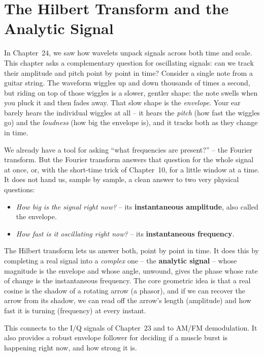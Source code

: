\chapter{The Hilbert Transform and the Analytic Signal}

In Chapter~24, we saw how wavelets unpack signals across both time and scale. This chapter asks a complementary question for oscillating signals: can we track their
amplitude and pitch point by point in time? Consider a single note from a guitar string.
The waveform wiggles up and down thousands of times a second, but riding on top of those
wiggles is a slower, gentler shape: the note swells when you pluck it and then fades
away. That slow shape is the \emph{envelope}. Your ear barely hears the individual
wiggles at all -- it hears the \emph{pitch} (how fast the wiggles go) and the
\emph{loudness} (how big the envelope is), and it tracks both as they change in time.

We already have a tool for asking ``what frequencies are present?'' -- the Fourier
transform. But the Fourier transform answers that question for the whole signal at once,
or, with the short-time trick of Chapter~10, for a little window at a time. It does not
hand us, sample by sample, a clean answer to two very physical questions:

\begin{itemize}
  \item \emph{How big is the signal right now?} -- its \textbf{instantaneous amplitude},
        also called the envelope.
  \item \emph{How fast is it oscillating right now?} -- its \textbf{instantaneous
        frequency}.
\end{itemize}

The Hilbert transform lets us answer both, point by point in time.
It does this by completing a real signal into a \emph{complex} one -- the
\textbf{analytic signal} -- whose magnitude is the envelope and whose angle, unwound,
gives the phase whose rate of change is the instantaneous frequency. The core geometric idea is that a real cosine is the shadow of a rotating arrow (a
phasor), and if we can recover the arrow from its shadow, we can read off the arrow's
length (amplitude) and how fast it is turning (frequency) at every instant.

This connects to the I/Q signals of Chapter~23 and to AM/FM demodulation. It also provides a robust envelope follower for deciding if a muscle burst is happening right now, and how strong it is.

